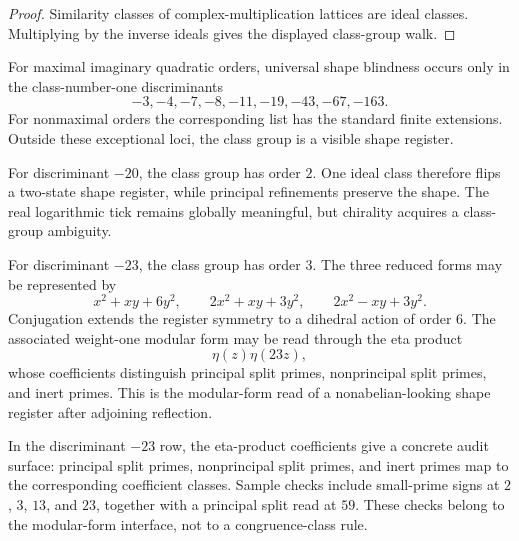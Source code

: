 \begin{proof}
Similarity classes of complex-multiplication lattices are ideal classes.
Multiplying by the inverse ideals gives the displayed class-group walk.
\end{proof}

\begin{principle}
\label{prin:innovation-input-modular-heegner-shape-blind-list}
For maximal imaginary quadratic orders, universal shape blindness occurs
only in the class-number-one discriminants
$$
-3,-4,-7,-8,-11,-19,-43,-67,-163.
$$
For nonmaximal orders the corresponding list has the standard finite
extensions. Outside these exceptional loci, the class group is a visible
shape register.
\end{principle}

\begin{example}
\label{ex:innovation-input-modular-discriminant-minus-twenty}
For discriminant $-20$, the class group has order $2$. One ideal class
therefore flips a two-state shape register, while principal refinements
preserve the shape. The real logarithmic tick remains globally meaningful,
but chirality acquires a class-group ambiguity.
\end{example}

\begin{example}
\label{ex:innovation-input-modular-discriminant-minus-twentythree}
For discriminant $-23$, the class group has order $3$. The three reduced
forms may be represented by
$$
x^2+xy+6y^2,
\qquad
2x^2+xy+3y^2,
\qquad
2x^2-xy+3y^2.
$$
Conjugation extends the register symmetry to a dihedral action of order
$6$. The associated weight-one modular form may be read through the eta
product
$$
\eta(z)\eta(23z),
$$
whose coefficients distinguish principal split primes, nonprincipal split
primes, and inert primes. This is the modular-form read of a
nonabelian-looking shape register after adjoining reflection.
\end{example}

\begin{principle}
\label{prin:innovation-input-modular-eta-product-coefficient-audit}
In the discriminant $-23$ row, the eta-product coefficients give a concrete
audit surface: principal split primes, nonprincipal split primes, and inert
primes map to the corresponding coefficient classes. Sample checks include
small-prime signs at $2$, $3$, $13$, and $23$, together with a principal
split read at $59$. These checks belong to the modular-form interface, not
to a congruence-class rule.
\end{principle}

